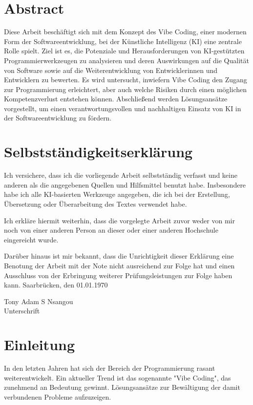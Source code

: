 \documentclass[paper=a4,fontsize=12pt,ngerman]{scrartcl}
\begin{document}
\pagestyle{plain}



\section*{Abstract}
Diese Arbeit beschäftigt sich mit dem Konzept des Vibe Coding, einer modernen Form der Softwareentwicklung, bei der Künstliche Intelligenz (KI) eine zentrale Rolle spielt. Ziel ist es, die Potenziale und Herausforderungen von KI-gestützten Programmierwerkzeugen zu analysieren und deren Auswirkungen auf die Qualität von Software sowie auf die Weiterentwicklung von Entwicklerinnen und Entwicklern zu bewerten. Es wird untersucht, inwiefern Vibe Coding den Zugang zur Programmierung erleichtert, aber auch welche Risiken durch einen möglichen Kompetenzverlust entstehen können. Abschließend werden Lösungsansätze vorgestellt, um einen verantwortungsvollen und nachhaltigen Einsatz von KI in der Softwareentwicklung zu fördern.

\clearpage
\section*{Selbstständigkeitserklärung}
Ich versichere, dass ich die vorliegende Arbeit selbstständig verfasst und 
keine anderen als die angegebenen Quellen und Hilfsmittel benutzt habe.
Insbesondere habe ich alle KI-basierten Werkzeuge angegeben, die ich bei
der Erstellung, Übersetzung oder Überarbeitung des Textes verwendet habe.

Ich erkläre hiermit weiterhin, dass die vorgelegte Arbeit zuvor weder von mir 
noch von einer anderen Person an dieser oder einer anderen Hochschule 
eingereicht wurde.

Darüber hinaus ist mir bekannt, dass die Unrichtigkeit dieser Erklärung eine 
Benotung der Arbeit mit der Note \glqq nicht ausreichend\grqq{} zur Folge hat 
und einen Ausschluss von der Erbringung weiterer Prüfungsleistungen zur Folge 
haben kann.
\bigskip
Saarbrücken, den 01.01.1970

\smallskip
\vspace{1cm}
\noindent
Tony Adam S Nsangou\\
Unterschrift

\clearpage
\tableofcontents
\thispagestyle{plain}

\clearpage
\section{Einleitung}
In den letzten Jahren hat sich der Bereich der Programmierung rasant weiterentwickelt.
Ein aktueller Trend ist das sogenannte "Vibe Coding", das zunehmend an Bedeutung gewinnt.
Lösungsansätze zur Bewältigung der damit verbundenen Probleme aufzuzeigen.
\end{document}
